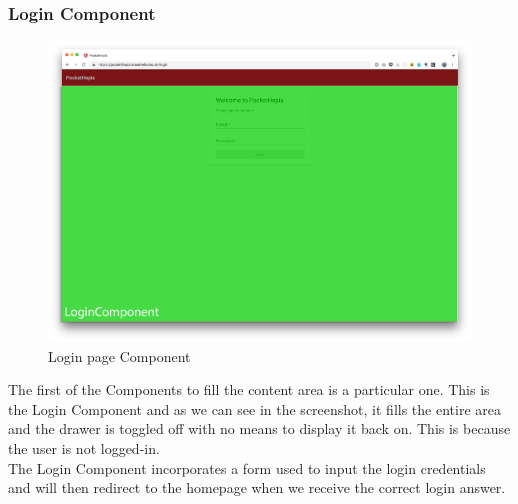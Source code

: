 \documentclass[twoside, openright,11pt,a4paper]{book}
\begin{document}
\subsubsection{Login Component}
\label{login_component_implementation}
\begin{figure}[H]
\begin{center}
	\includegraphics[width=\textwidth]{assets/screens/angular/login}
	\caption{Login page Component}
		\label{login_screen}
\end{center}
\end{figure}
The first of the Components to fill the content area is a particular one. This is the Login Component and as we can see in the screenshot, it fills the entire area and the drawer is toggled off with no means to display it back on. This is because the user is not logged-in.\\

The Login Component incorporates a form used to input the login credentials and will then redirect to the homepage when we receive the correct login answer.
\end{document}
